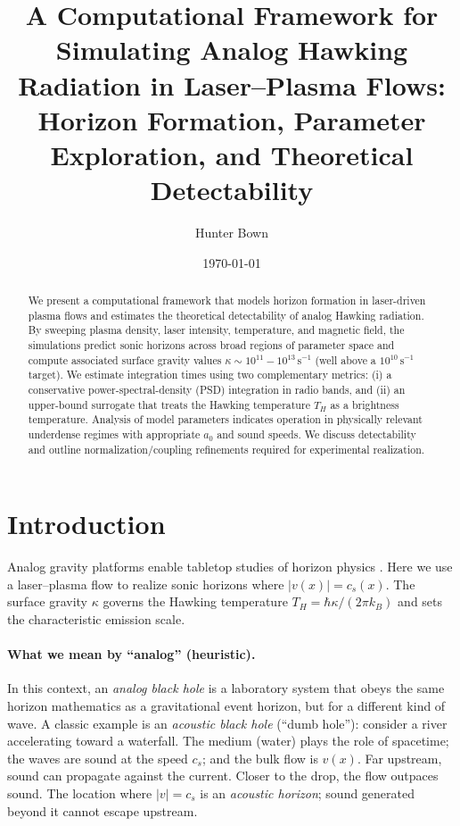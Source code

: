\documentclass[11pt]{article}
\title{A Computational Framework for Simulating Analog Hawking Radiation in Laser--Plasma Flows: Horizon Formation, Parameter Exploration, and Theoretical Detectability}
\author{Hunter Bown}
\date{\today}
\begin{document}
\maketitle

\begin{abstract}
We present a computational framework that models horizon formation in laser-driven plasma flows and estimates the theoretical detectability of analog Hawking radiation. By sweeping plasma density, laser intensity, temperature, and magnetic field, the simulations predict sonic horizons across broad regions of parameter space and compute associated surface gravity values $\kappa \sim 10^{11}{-}10^{13}\,\mathrm{s^{-1}}$ (well above a $10^{10}\,\mathrm{s^{-1}}$ target). We estimate integration times using two complementary metrics: (i) a conservative power-spectral-density (PSD) integration in radio bands, and (ii) an upper-bound surrogate that treats the Hawking temperature $T_H$ as a brightness temperature. Analysis of model parameters indicates operation in physically relevant underdense regimes with appropriate $a_0$ and sound speeds. We discuss detectability and outline normalization/coupling refinements required for experimental realization.
\end{abstract}

\section{Introduction}
Analog gravity platforms enable tabletop studies of horizon physics \cite{Hawking1974,Hawking1975,Unruh1981,Barcelo2011,Weinfurtner2011,Steinhauer2016,Drori2019}. Here we use a laser--plasma flow to realize sonic horizons where $|v(x)| = c_s(x)$. The surface gravity $\kappa$ governs the Hawking temperature $T_H = \hbar \kappa/(2\pi k_B)$ and sets the characteristic emission scale.

\paragraph{What we mean by ``analog'' (heuristic).}
In this context, an \emph{analog black hole} is a laboratory system that obeys the same horizon mathematics as a gravitational event horizon, but for a different kind of wave. A classic example is an \emph{acoustic black hole} (``dumb hole''): consider a river accelerating toward a waterfall. The medium (water) plays the role of spacetime; the waves are sound at the speed $c_s$; and the bulk flow is $v(x)$. Far upstream, sound can propagate against the current. Closer to the drop, the flow outpaces sound. The location where $|v| = c_s$ is an \emph{acoustic horizon}; sound generated beyond it cannot escape upstream.
\end{document}
